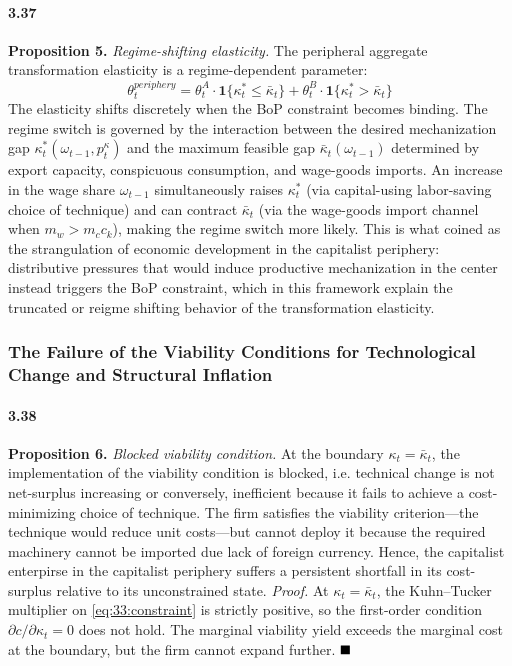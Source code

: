 \paragraph{3.37}
\textbf{Proposition 5.} \textit{Regime-shifting elasticity.}
The peripheral aggregate transformation elasticity is a
regime-dependent parameter:
\begin{equation}
	\theta^{periphery}_t
	= \theta^{A}_t \cdot \mathbf{1}\{\kappa_t^* \le \bar{\kappa}_t\}
	+ \theta^{B}_t \cdot \mathbf{1}\{\kappa_t^* > \bar{\kappa}_t\}
	\label{eq:33:theta_regime}
\end{equation}
The elasticity shifts discretely when the BoP constraint
becomes binding. The regime switch is governed by the
interaction between the desired mechanization gap
$\kappa_t^*(\omega_{t-1}, p^\kappa_t)$ and the maximum
feasible gap $\bar{\kappa}_t(\omega_{t-1})$ determined by
export capacity, conspicuous consumption, and wage-goods
imports. An increase in the wage share $\omega_{t-1}$
simultaneously raises $\kappa_t^*$ (via capital-using 
labor-saving choice of technique) and can contract $\bar{\kappa}_t$ (via
the wage-goods import channel when $m_w > m_c c_k$), making
the regime switch more likely. This is what \citet{Prebisch1981} coined as the strangulation of economic development in the capitalist periphery: distributive pressures that would induce
productive mechanization in the center instead triggers the
BoP constraint, which in this framework explain the truncated or reigme shifting behavior of the transformation elasticity.

\subsubsection{The Failure of the Viability Conditions for Technological Change and Structural Inflation}

\paragraph{3.38}
\textbf{Proposition 6.} \textit{Blocked viability condition.}
At the boundary $\kappa_t = \bar{\kappa}_t$, the
implementation of the viability condition is blocked, i.e. technical change is not net-surplus increasing or conversely, inefficient because it fails to achieve a cost-minimizing choice of technique. The firm satisfies the viability criterion---the technique would reduce unit costs---but cannot deploy it because the required machinery cannot be imported due lack of foreign currency. Hence, the capitalist enterpirse in the capitalist periphery suffers a persistent shortfall in its cost-surplus
relative to its unconstrained state.
\textit{Proof.} At $\kappa_t = \bar{\kappa}_t$, the
Kuhn--Tucker multiplier on \eqref{eq:33:constraint} is
strictly positive, so the first-order condition
$\partial c / \partial \kappa_t = 0$ does not hold. The
marginal viability yield exceeds the marginal cost at the
boundary, but the firm cannot expand further.
$\hfill\blacksquare$

